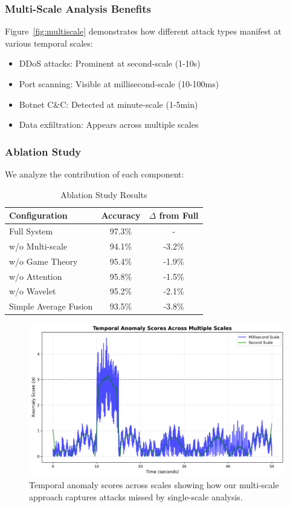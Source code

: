 \documentclass[10pt,conference]{IEEEtran}
\begin{document}
\subsubsection{Multi-Scale Analysis Benefits}

Figure~\ref{fig:multiscale} demonstrates how different attack types manifest at various temporal scales:
\begin{itemize}
    \item DDoS attacks: Prominent at second-scale (1-10s)
    \item Port scanning: Visible at millisecond-scale (10-100ms)
    \item Botnet C\&C: Detected at minute-scale (1-5min)
    \item Data exfiltration: Appears across multiple scales
\end{itemize}

\subsubsection{Ablation Study}

We analyze the contribution of each component:

\begin{table}[!t]
\centering
\caption{Ablation Study Results}
\label{tab:ablation}
\begin{tabular}{lcc}
\toprule
\textbf{Configuration} & \textbf{Accuracy} & \textbf{$\Delta$ from Full} \\
\midrule
Full System & 97.3\% & - \\
w/o Multi-scale & 94.1\% & -3.2\% \\
w/o Game Theory & 95.4\% & -1.9\% \\
w/o Attention & 95.8\% & -1.5\% \\
w/o Wavelet & 95.2\% & -2.1\% \\
Simple Average Fusion & 93.5\% & -3.8\% \\
\bottomrule
\end{tabular}
\end{table}

\begin{figure}[!t]
\centering
\includegraphics[width=\columnwidth]{figures/anomaly_scores.png}
\caption{Temporal anomaly scores across scales showing how our multi-scale approach captures attacks missed by single-scale analysis.}
\label{fig:anomalyscores}
\end{figure}
\end{document}
